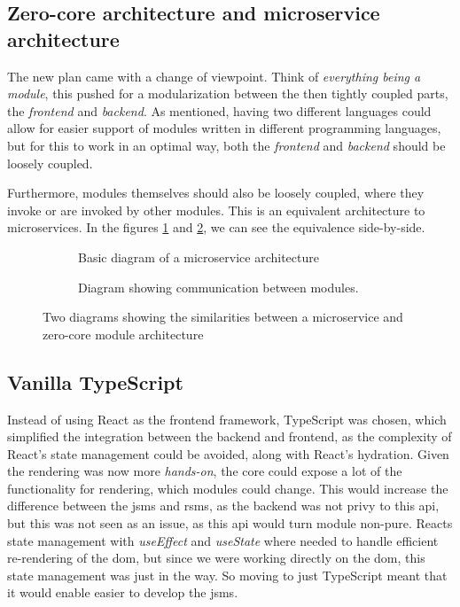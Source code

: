 \subsection{Zero-core architecture and microservice architecture}

The new plan came with a change of viewpoint. Think of
\textit{everything being a module}, this pushed for a modularization between the
then tightly coupled parts, the \textit{frontend} and \textit{backend}. As
mentioned, having two different languages could allow for easier support of
modules written in different programming languages, but for this to work in an
optimal way, both the \textit{frontend} and \textit{backend} should be loosely
coupled.

Furthermore, modules themselves should also be loosely coupled, where they
invoke or are invoked by other modules. This is an equivalent architecture to
microservices. In the figures \ref{sfig:mic} and \ref{sfig:mod}, we can see the
equivalence side-by-side.

\begin{figure}[H]
  \begin{subfigure}[h]{0.49\linewidth}
    
    \caption{Basic diagram of a microservice architecture}
    \label{sfig:mic}
  \end{subfigure}
  \hfill
  \begin{subfigure}[h]{0.49\linewidth}
    
    \caption{
      Diagram showing communication between modules.
    }
    \label{sfig:mod}
  \end{subfigure}
  \caption{
    Two diagrams showing the similarities between a microservice and zero-core
    module architecture
  }
  \label{fig:comp}
\end{figure}


\subsection{Vanilla TypeScript}

Instead of using React as the frontend framework, TypeScript was chosen, which
simplified the integration between the backend and frontend, as the complexity
of React's state management could be avoided, along with React's hydration.
Given the rendering was now more \textit{hands-on}, the core could expose a lot
of the functionality for rendering, which modules could change. This would
increase the difference between the \gls*{jsms} and \gls*{rsms}, as the backend
was not privy to this \gls*{api}, but this was not seen as an issue, as this
\gls*{api} would turn module non-pure. Reacts state management with
\textit{useEffect} and \textit{useState} where needed to handle efficient
re-rendering of the \gls{dom}, but since we were working directly on the
\gls{dom}, this state management was just in the way. So moving to just
TypeScript meant that it would enable easier to develop the \gls*{jsms}.


